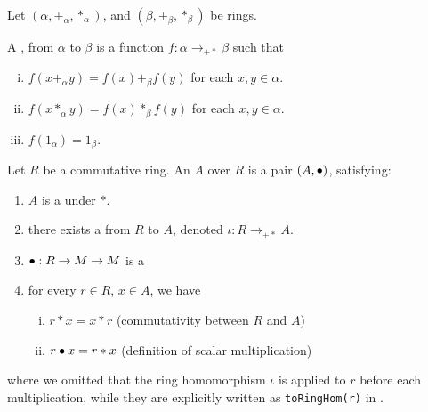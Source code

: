 
\begin{definition}
    \label{RingHom}
    \leanok

    Let $(\alpha, +_\alpha, *_\alpha)$, and $(\beta, +_\beta, *_\beta)$ be rings.
    
    A , from $\alpha$ to $\beta$ is a function $f : \alpha \to_{+*} \beta$ such that

    \begin{enumerate}[(i)]
        \item $f(x +_{\alpha} y) = f(x) +_{\beta} f(y)$ for each $x,y \in \alpha$.
        \item $f(x *_{\alpha} y) = f(x) *_{\beta} f(y)$ for each $x,y \in \alpha$.
        \item $f(1_{\alpha}) = 1_{\beta}$.
    \end{enumerate}

\end{definition}

\begin{definition}[Algebra]
    \label{Algebra}
    \leanok

    Let $R$ be a commutative ring. An  $A$ over $R$ is a pair $(A, \bullet)$, satisfying:

    \begin{enumerate}
    \item $A$ is a  under $*$.
    
    \item there exists a  from $R$ to $A$, denoted $\iota : R \to_{+*} A$.
    
    \item $\bullet : R \to M \to M$ is a 
    
    \item for every $r \in R$, $x \in A$, we have

    \begin{enumerate}[(i)]
        \item $r * x = x * r$ (commutativity between $R$ and $A$)
        \item $r \bullet x = r * x$ (definition of scalar multiplication)
    \end{enumerate}

    \end{enumerate}

    where we omitted that the ring homomorphism $\iota$ is applied to $r$ before each multiplication,
    while they are explicitly written as \lstinline|toRingHom(r)| in \Mathlib.

\end{definition}

